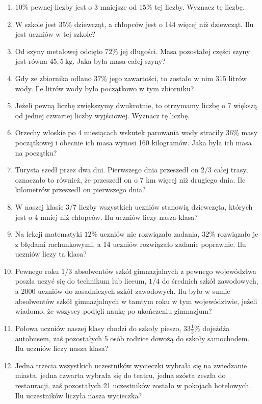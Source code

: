 \documentclass[10pt]{article}
\begin{document}
\begin{enumerate}
  \item \(10 \%\) pewnej liczby jest o 3 mniejsze od \(15 \%\) tej liczby. Wyznacz tę liczbę.
  \item W szkole jest \(35 \%\) dziewcząt, a chłopców jest o 144 więcej niż dziewcząt. Ilu jest uczniów w tej szkole?
  \item Od szyny metalowej odcięto \(72 \%\) jej długości. Masa pozostałej części szyny jest równa \(45,5 \mathrm{~kg}\). Jaka była masa całej szyny?
  \item Gdy ze zbiornika odlano \(37 \%\) jego zawartości, to zostało w nim 315 litrów wody. Ile litrów wody było początkowo w tym zbiorniku?
  \item Jeżeli pewną liczbę zwiększymy dwukrotnie, to otrzymamy liczbę o 7 większą od jednej czwartej liczby wyjściowej. Wyznacz tę liczbę.
  \item Orzechy włoskie po 4 miesiącach wskutek parowania wody straciły \(36 \%\) masy początkowej i obecnie ich masa wynosi 160 kilogramów. Jaka była ich masa na początku?
  \item Turysta szedł przez dwa dni. Pierwszego dnia przeszedł on \(2 / 3\) całej trasy, oznaczało to również, że przeszedł on o 7 km więcej niż drugiego dnia. Ile kilometrów przeszedł on pierwszego dnia?
  \item W naszej klasie \(3 / 7\) liczby wszystkich uczniów stanowią dziewczęta, których jest o 4 mniej niż chłopców. Ilu uczniów liczy nasza klasa?
  \item Na lekcji matematyki \(12 \%\) uczniów nie rozwiązało zadania, \(32 \%\) rozwiązało je z błędami rachunkowymi, a 14 uczniów rozwiązało zadanie poprawnie. Ilu uczniów liczy ta klasa?
  \item Pewnego roku \(1 / 3\) absolwentów szkół gimnazjalnych z pewnego województwa poszła uczyć się do technikum lub liceum, \(1 / 4\) do średnich szkół zawodowych, a 2000 uczniów do zasadniczych szkół zawodowych. Ilu było w sumie absolwentów szkół gimnazjalnych w tamtym roku w tym województwie, jeżeli wiadomo, że wszyscy podjęli naukę po ukończeniu gimnazjum?
  \item Połowa uczniów naszej klasy chodzi do szkoły pieszo, \(33 \frac{1}{3} \%\) dojeżdża autobusem, zaś pozostałych 5 osób rodzice dowożą do szkoły samochodem. Ilu uczniów liczy nasza klasa?
  \item Jedna trzecia wszystkich uczestników wycieczki wybrała się na zwiedzanie miasta, jedna czwarta wybrała się do teatru, jedna szósta zeszła do restauracji, zaś pozostałych 21 uczestników zostało w pokojach hotelowych. Ilu uczestników liczyła nasza wycieczka?

\end{enumerate}
\end{document}
